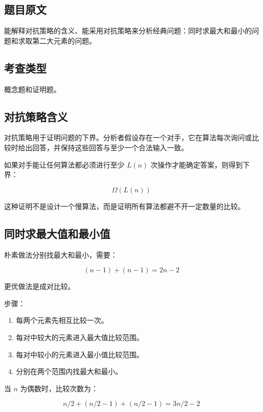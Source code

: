 \documentclass[UTF8,zihao=-4]{ctexart}
\begin{document}
\subsection*{题目原文}

能解释对抗策略的含义、能采用对抗策略来分析经典问题：同时求最大和最小的问题和求取第二大元素的问题。

\subsection*{考查类型}

概念题和证明题。

\subsection*{对抗策略含义}

对抗策略用于证明问题的下界。分析者假设存在一个对手，它在算法每次询问或比较时给出回答，并保持这些回答与至少一个合法输入一致。

如果对手能让任何算法都必须进行至少 $L(n)$ 次操作才能确定答案，则得到下界：

\[\Omega(L(n))\]

这种证明不是设计一个慢算法，而是证明所有算法都避不开一定数量的比较。

\subsection*{同时求最大值和最小值}

朴素做法分别找最大和最小，需要：

\[(n - 1) + (n - 1) = 2n - 2\]

更优做法是成对比较。

步骤：

\begin{enumerate}
\item 每两个元素先相互比较一次。
\item 每对中较大的元素进入最大值比较范围。
\item 每对中较小的元素进入最小值比较范围。
\item 分别在两个范围内找最大和最小。
\end{enumerate}

当 $n$ 为偶数时，比较次数为：

\[n/2 + (n/2 - 1) + (n/2 - 1) = 3n/2 - 2\]
\end{document}
